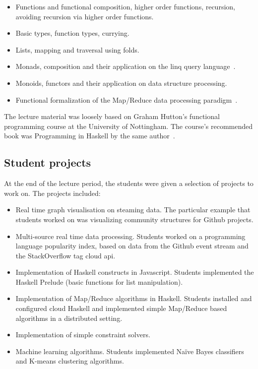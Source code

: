 \documentclass[conference]{IEEEtran}
\begin{document}
\begin{itemize}

  \item Functions and functional composition, higher order functions, recursion, 
    avoiding recursion via higher order functions.

  \item Basic types, function types, currying.

  \item Lists, mapping and traversal using folds.

  \item Monads, composition and their application on the {\sc linq} query 
    language~\cite{Meije11}.

  \item Monoids, functors and their application on data structure processing.

  \item Functional formalization of the Map/Reduce data processing
    paradigm~\cite{Lamme08}.

\end{itemize}

The lecture material was loosely based on Graham Hutton's functional programming
course at the University of Nottingham. The course's recommended book was
Programming in Haskell by the same author~\cite{Hutto07}.

\subsection{Student projects}

At the end of the lecture period, the students were given a selection of
projects to work on. The projects included:

\begin{itemize}

  \item Real time graph visualisation on steaming data. The
    particular example that students worked on was visualizing community
    structures for Github projects.

  \item Multi-source real time data processing. Students worked on a 
    programming language popularity index, based on data from the Github
    event stream and the StackOverflow tag cloud {\sc api}.

  \item Implementation of Haskell constructs in Javascript. Students implemented
    the Haskell Prelude (basic functions for list manipulation).

  \item Implementation of Map/Reduce algorithms in Haskell. Students installed
    and configured cloud Haskell and implemented simple Map/Reduce based
    algorithms in a distributed setting.

  \item Implementation of simple constraint solvers.
  
  \item Machine learning algorithms. Students implemented Na\"ive Bayes 
    classifiers and K-means clustering algorithms.

\end{itemize}
\end{document}
